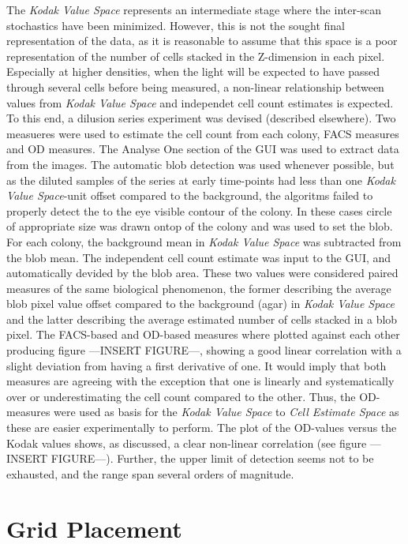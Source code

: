 \documentclass{article}
\begin{document}
The \emph{Kodak Value Space} represents an intermediate stage where the 
inter-scan stochastics have been minimized. 
However, this is not the sought final representation of the data, as it is
reasonable to assume that this space is a poor representation of the number
of cells stacked in the Z-dimension in each pixel.
Especially at higher densities, when the light will be expected to have
passed through several cells before being measured, a non-linear relationship
between values from \emph{Kodak Value Space} and independet cell count
estimates is expected.
To this end, a dilusion series experiment was devised (described elsewhere).
Two measueres were used to estimate the cell count from each colony, FACS
measures and OD measures.
The Analyse One section of the GUI was used to extract data from the images.
The automatic blob detection was used whenever possible, but as the diluted
samples of the series at early time-points had less than one 
\emph{Kodak Value Space}-unit offset compared to the background, the algoritms
failed to properly detect the to the eye visible contour of the colony.
In these cases circle of appropriate size was drawn ontop of the colony and
was used to set the blob.
For each colony, the background mean in \emph{Kodak Value Space} was subtracted
from the blob mean. 
The independent cell count estimate was input to the GUI, and automatically 
devided by the blob area. 
These two values were considered paired measures of the same biological 
phenomenon, the former describing the average blob pixel value offset compared to
the background (agar) in \emph{Kodak Value Space} and the latter describing the
average estimated number of cells stacked in a blob pixel.
The FACS-based and OD-based measures where plotted against each other producing
figure ---INSERT FIGURE---, showing a good linear correlation with a slight
deviation from having a first derivative of one. 
It would imply that both measures are agreeing with the exception that one is
linearly and systematically over or underestimating the cell count compared to 
the other.
Thus, the OD-measures were used as basis for the \emph{Kodak Value Space} to
\emph{Cell Estimate Space} as these are easier experimentally to perform.
The plot of the OD-values versus the Kodak values shows, as discussed, a clear
non-linear correlation (see figure ---INSERT FIGURE---).
Further, the upper limit of detection seems not to be exhausted, and the range 
span several orders of magnitude.


\section{Grid Placement}
\end{document}

